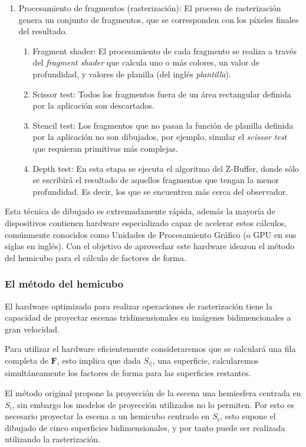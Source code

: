 \begin{enumerate}
	\item Procesamiento de fragmentos (rasterización):
		El proceso de rasterización genera un conjunto de fragmentos, que se corresponden con los píxeles finales del resultado.
		\begin{enumerate}
			\item Fragment shader: El procesamiento de cada fragmento se realiza a través del \textit{fragment shader} que calcula uno o más colores, un valor de profundidad, y valores de planilla (del inglés \textit{plantilla}).
			\item Scissor test: Todos los fragmentos fuera de un área rectangular definida por la aplicación son descartados.
			\item Stencil test: Los fragmentos que no pasan la función de planilla definida por la aplicación no son dibujados, por ejemplo, simular el \textit{scissor test} que requieran primitivas más complejas.
			\item Depth test: En esta etapa se ejecuta el algoritmo del Z-Buffer, donde sólo se escribirá el resultado de aquellos fragmentos que tengan la menor profundidad. Es decir, los que se encuentren más cerca del observador.
		\end{enumerate}
\end{enumerate}

Esta técnica de dibujado es extremadamente rápida, además la mayoría de dispositivos contienen hardware especializado capaz de acelerar estos cálculos, comúnmente conocidos como Unidades de Procesamiento Gráfico (o GPU en sus siglas en inglés). Con el objetivo de aprovechar este hardware \citeauthor{Cohen} idearon el método del hemicubo para el cálculo de factores de forma.

\subsubsection{El método del hemicubo}

El hardware optimizado para realizar operaciones de rasterización tiene la capacidad de proyectar escenas tridimensionales en imágenes bidimencionales a gran velocidad.

Para utilizar el hardware eficientemente consideraremos que se calculará una fila completa de $\mathbf{F}$, esto implica que dada $S_{i]}$, una superficie, calcularemos simultáneamente los factores de forma para las superficies restantes. 

El método original propone la proyección de la escena una hemiesfera centrada en $S_{i}$, sin embargo los modelos de proyección utilizados no lo permiten. Por esto es necesario proyectar la escena a un hemicubo centrado en $S_{i}$, esto supone el dibujado de cinco superficies bidimensionales, y por tanto puede ser realizada utilizando la rasterización.

